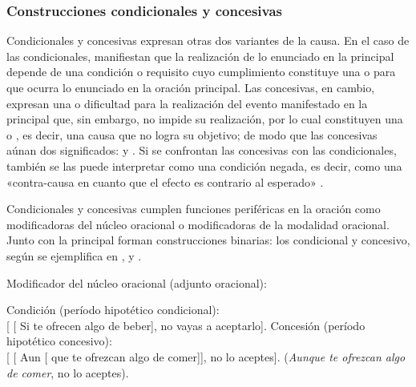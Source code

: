 \subsubsection{Construcciones condicionales y concesivas}\label{sec:13-condicionales}

Condicionales y concesivas expresan otras dos variantes de la causa. En el caso
de las condicionales, manifiestan que la realización de lo enunciado en la
principal depende de una condición o requisito cuyo cumplimiento constituye una
 o  para que ocurra lo enunciado en la oración
principal. Las concesivas, en cambio, expresan una  o dificultad
para la realización del evento manifestado en la principal que, sin embargo, no
impide su realización, por lo cual constituyen una  o
, es decir, una causa que no logra su objetivo; de modo que las
concesivas aúnan dos significados:  y 
\parencite{giammatteo2019}. Si se confrontan las concesivas con las
condicionales, también se las puede interpretar como una condición negada, es
decir, como una «contra-causa en cuanto que el efecto es contrario al esperado»
\parencite[344]{fernandezlagunilla1995}.

Condicionales y concesivas cumplen funciones periféricas en la oración como
modificadoras del núcleo oracional o modificadoras de la modalidad oracional.
Junto con la principal forman construcciones binarias: los  condicional y concesivo, según se ejemplifica en
,  y .

\begin{exe}
  \ex\label{ex:13-mno} Modificador del núcleo oracional (adjunto oracional):
    \begin{xlist}
      \ex\label{ex:13-mno-a} Condición (período hipotético condicional):\\
          {}[ [ Si te ofrecen algo de beber], no vayas a
          aceptarlo].
      \ex\label{ex:13-mno-b} Concesión (período hipotético concesivo):\\
          {}[ [ Aun [ que te ofrezcan algo de
          comer]], no lo aceptes]. (\textit{Aunque te ofrezcan algo de comer},
          no lo aceptes).
    \end{xlist}
\end{exe}

